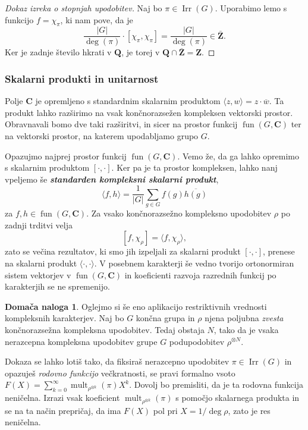 \documentclass[11pt]{book}
\def\ZZ{\mathbf{Z}}
\def\QQ{\mathbf{Q}}
\def\CC{\mathbf{C}}
\DeclareMathOperator\mult{mult}
\DeclareMathOperator\Irr{Irr}
\DeclareMathOperator\fun{fun}
\def\definicija{\color{rdeca}\bf\em}
\theoremstyle{definition}
\theoremstyle{zgled}
\theoremstyle{odprtproblem}
\theoremstyle{domacanaloga}
\newtheorem*{domacanaloga}{Domača naloga}
\newenvironment{dokaz}
    {\color{siva}\begin{proof}}
    {\end{proof}}
\theoremstyle{izrek}
\begin{document}
    \begin{dokaz}[Dokaz izreka o stopnjah upodobitev]
    Naj bo $\pi \in \Irr(G)$. Uporabimo lemo s funkcijo $f = \chi_{\pi}$, ki nam pove, da je 
    \[
        \frac{|G|}{\deg(\pi)} \cdot [ \chi_{\pi}, \chi_{\pi} ] = \frac{|G|}{\deg(\pi)} \in \bar{\ZZ}.
    \]
    Ker je zadnje število hkrati v $\QQ$, je torej v $\QQ \cap \bar{\ZZ} = \ZZ$.
    \end{dokaz}

\subsubsection{Skalarni produkti in unitarnost}

Polje $\CC$ je opremljeno s standardnim skalarnim produktom $\langle z, w \rangle = z \cdot \overline{w}$. Ta produkt lahko razširimo na vsak končnorazsežen kompleksen vektorski prostor. Obravnavali bomo dve taki razširitvi, in sicer na prostor funkcij $\fun(G,\CC)$ ter na vektorski prostor, na katerem upodabljamo grupo $G$.

Opazujmo najprej prostor funkcij $\fun(G,\CC)$. Vemo že, da ga lahko opremimo s skalarnim produktom $[\cdot, \cdot]$. Ker pa je ta prostor kompleksen, lahko nanj vpeljemo še {\definicija standarden kompleksni skalarni produkt},
\[
    \langle f, h \rangle = \frac{1}{|G|} \sum_{g \in G} f(g) \overline{h(g)}
\]
za $f,h \in \fun(G,\CC)$. Za vsako končnorazsežno kompleksno upodobitev $\rho$  po zadnji trditvi velja
\[
    [f, \chi_{\rho}] = \langle f, \chi_{\rho} \rangle,
\]
zato se večina rezultatov, ki smo jih izpeljali za skalarni produkt $[\cdot, \cdot]$, prenese na skalarni produkt $\langle \cdot, \cdot \rangle$. V posebnem  karakterji še vedno tvorijo ortonormiran sistem vektorjev v $\fun(G,\CC)$ in koeficienti razvoja razrednih funkcij po karakterjih se ne spremenijo.

\begin{domacanaloga}
Oglejmo si še eno aplikacijo restriktivnih vrednosti kompleksnih karakterjev. Naj bo $G$ končna grupa in $\rho$ njena poljubna \emph{zvesta} končnorazsežna kompleksna upodobitev. Tedaj obstaja $N$, tako da je vsaka nerazcepna kompleksna upodobitev grupe $G$ podupodobitev $\rho^{\otimes N}$. 

Dokaza se lahko lotiš tako, da fiksiraš nerazcepno upodobitev $\pi \in \Irr(G)$ in opazuješ \emph{rodovno funkcijo} večkratnosti, se pravi formalno vsoto $F(X) = \sum_{k = 0}^{\infty} \mult_{\rho^{\otimes k}}(\pi) X^k$. Dovolj bo premisliti, da je ta rodovna funkcija neničelna. Izrazi vsak koeficient $\mult_{\rho^{\otimes k}}(\pi)$ s pomočjo skalarnega produkta in se na ta način prepričaj, da ima $F(X)$ pol pri $X = 1/\deg \rho$, zato je res neničelna.
\end{domacanaloga}
\end{document}

